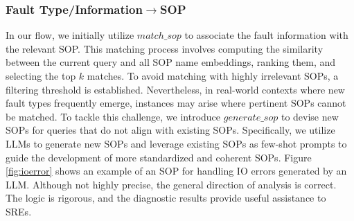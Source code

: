 \subsubsection{Fault Type/Information$\rightarrow$SOP}




In our flow, we initially utilize $match\_sop$ to associate the fault information with the relevant SOP. This matching process involves computing the similarity between the current query and all SOP name embeddings, ranking them, and selecting the top \(k\) matches. To avoid matching with highly irrelevant SOPs, a filtering threshold is established. Nevertheless, in real-world contexts where new fault types frequently emerge, instances may arise where pertinent SOPs cannot be matched. To tackle this challenge, we introduce $generate\_sop$ to devise new SOPs for queries that do not align with existing SOPs. Specifically, we utilize LLMs to generate new SOPs and leverage existing SOPs as few-shot prompts to guide the development of more standardized and coherent SOPs. Figure \ref{fig:ioerror} shows an example of an SOP for handling IO errors generated by an LLM. Although not highly precise, the general direction of analysis is correct. The logic is rigorous, and the diagnostic results provide useful assistance to SREs.


